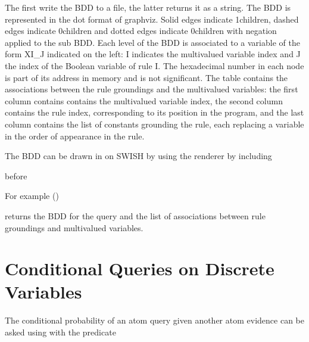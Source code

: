 \documentclass[letterpaper,10pt,english]{sphinxmanual}
\begin{document}
\sphinxAtStartPar
The first write the BDD to a file, the latter returns it as a string.
The BDD is represented in the dot format of graphviz.
Solid edges indicate 1\sphinxhyphen{}children, dashed edges indicate 0\sphinxhyphen{}children and dotted edges indicate 0\sphinxhyphen{}children
with negation applied to the sub BDD.
Each level of the BDD is associated to a variable of the form XI\_J indicated on the left: I indicates the multivalued variable index and J the index of the Boolean variable of rule I.
The hexadecimal number in each node is part of its address in memory and is not significant.
The table  contains the associations between the rule groundings and the multivalued variables: the first column contains contains the multivalued variable index, the second column contains the rule index, corresponding to its position in the program, and the last column contains the list of constants grounding the rule, each replacing a variable in the order of appearance in the rule.

\sphinxAtStartPar
The BDD can be drawn in  on SWISH by using the  renderer by including

\begin{sphinxVerbatim}[commandchars=\\\{\}]
 
\end{sphinxVerbatim}

\sphinxAtStartPar
before 

\sphinxAtStartPar
For example ()

\begin{sphinxVerbatim}[commandchars=\\\{\}]
 
\end{sphinxVerbatim}

\sphinxAtStartPar
returns the BDD for the query  and the list of associations between rule groundings
and multivalued variables.


\section{Conditional Queries on Discrete Variables}
\label{\detokenize{index:conditional-queries-on-discrete-variables}}
\sphinxAtStartPar
The conditional probability of an atom query given another atom evidence can be asked using 
with the predicate
\end{document}
